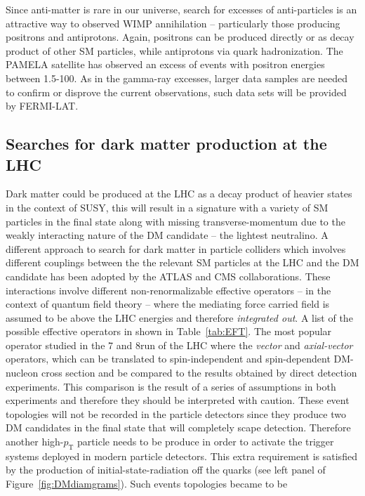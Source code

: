 Since anti-matter is rare in our universe, search for excesses of
anti-particles is an attractive way to observed WIMP annihilation --
particularly those producing positrons and antiprotons. Again,
positrons can be produced directly or as decay product of other SM
particles, while antiprotons via quark hadronization. The PAMELA
satellite\cite{PAMELA} has observed an excess of events with positron energies
between 1.5-100\GeV\cite{PAMELAEXCESS}. As
in the gamma-ray excesses, larger data samples are needed to confirm or
disprove the current observations, such data sets will be provided by
FERMI-LAT.

\subsection{Searches for dark matter production at the LHC}
Dark matter could be produced at the LHC as a decay product of heavier
states in the context of SUSY, this will result in a signature with a
variety of SM particles in the final state along with missing
transverse-momentum due to the weakly interacting nature of the DM
candidate -- the lightest neutralino.  A different approach to search
for dark matter in particle colliders which involves different
couplings between the the relevant SM particles at the LHC and the DM
candidate has been adopted by the ATLAS and CMS collaborations. These
interactions involve different non-renormalizable effective operators
-- in the context of quantum field theory -- where the mediating
force carried field is assumed to be above the LHC energies and
therefore \textit{integrated out}. A list of the possible effective
operators in shown in Table~\ref{tab:EFT}. The most popular
operator studied in the 7 and 8\TeV run of the LHC where the
\textit{vector} and \textit{axial-vector} operators, which can be
translated to spin-independent and spin-dependent DM-nucleon cross
section and be compared to the results obtained by direct detection
experiments. This comparison is the result of a series of assumptions
in both experiments and therefore they should be interpreted with
caution. These event topologies will not be recorded in the particle
detectors since they produce two DM candidates in the
final state that will completely scape detection. Therefore another
high-$p_{\mathrm{T}}$ particle needs to be produce in order to
activate the trigger systems deployed in modern particle
detectors. This extra requirement is satisfied by the production of
initial-state-radiation off the quarks (see left panel of
Figure~\ref{fig:DMdiamgrams}). Such events topologies became to be
